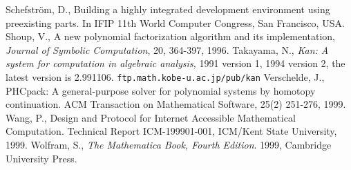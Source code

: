\begin{thebibliography}{X}
Schefstr\"om, D.,
Building a highly integrated development environment using
preexisting parts.
In IFIP 11th World Computer Congress, San Francisco, USA.
Shoup, V., 
A new polynomial factorization algorithm and 
its implementation,
{\sl Journal of Symbolic Computation}, 20, 364-397, 1996.
	Takayama, N.,
	{\em Kan: A system for computation in
	algebraic analysis,} 1991 version 1,
        1994 version 2, the latest version is 2.991106. 
	{\tt \small ftp.math.kobe-u.ac.jp/pub/kan}
Verschelde, J.,
PHCpack: A general-purpose solver for polynomial systems by
homotopy continuation.  ACM Transaction on Mathematical Software, 25(2) 
251-276, 1999.
Wang, P.,
Design and Protocol for Internet Accessible Mathematical Computation.
Technical Report ICM-199901-001, ICM/Kent State University, 1999.
Wolfram, S.,
{\it The Mathematica Book, Fourth Edition}.
1999, Cambridge University Press.
\end{thebibliography}
